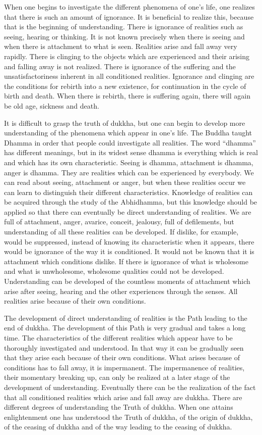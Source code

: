\documentclass{book}
\begin{document}
When one begins to investigate the different phenomena of one's life,
one realizes that there is such an amount of ignorance. It is beneficial
to realize this, because that is the beginning of understanding. There
is ignorance of realities such as seeing, hearing or thinking. It is not
known precisely when there is seeing and when there is attachment to
what is seen. Realities arise and fall away very rapidly. There is
clinging to the objects which are experienced and their arising and
falling away is not realized. There is ignorance of the suffering and
the unsatisfactoriness inherent in all conditioned realities. Ignorance
and clinging are the conditions for rebirth into a new existence, for
continuation in the cycle of birth and death. When there is rebirth,
there is suffering again, there will again be old age, sickness and
death.

It is difficult to grasp the truth of dukkha, but one can begin to
develop more understanding of the phenomena which appear in one's life.
The Buddha taught Dhamma in order that people could investigate all
realities. The word ``dhamma'' has different meanings, but in its widest
sense dhamma is everything which is real and which has its own
characteristic. Seeing is dhamma, attachment is dhamma, anger is dhamma.
They are realities which can be expe­rienced by everybody. We can read
about seeing, attach­ment or anger, but when these realities occur we
can learn to distinguish their different characteristics. Knowledge of
realities can be acquired through the study of the Abhidhamma, but this
knowledge should be applied so that there can eventually be direct
understanding of realities. We are full of attachment, anger, avarice,
conceit, jealousy, full of defilements, but understanding of all these
realities can be developed. If dislike, for example, would be
suppressed, instead of knowing its characteristic when it appears, there
would be ignorance of the way it is conditioned. It would not be known
that it is attachment which conditions dislike. If there is ignorance of
what is wholesome and what is unwholesome, wholesome qualities could not
be developed. Understanding can be developed of the countless moments of
attachment which arise after seeing, hearing and the other experiences
through the senses. All realities arise because of their own conditions.

The development of direct understanding of realities is the Path leading
to the end of dukkha. The development of this Path is very gradual and
takes a long time. The characteristics of the different realities which
appear have to be thoroughly investigated and understood. In that way it
can be gradually seen that they arise each because of their own
conditions. What arises because of conditions has to fall away, it is
impermanent. The impermanence of realities, their momentary breaking up,
can only be realized at a later stage of the development of
under­standing. Eventually there can be the realization of the fact that
all conditioned realities which arise and fall away are dukkha. There
are different degrees of understanding the Truth of dukkha. When one
attains enlightenment one has understood the Truth of dukkha, of the
origin of dukkha, of the ceasing of dukkha and of the way leading to the
ceasing of dukkha.
\end{document}
